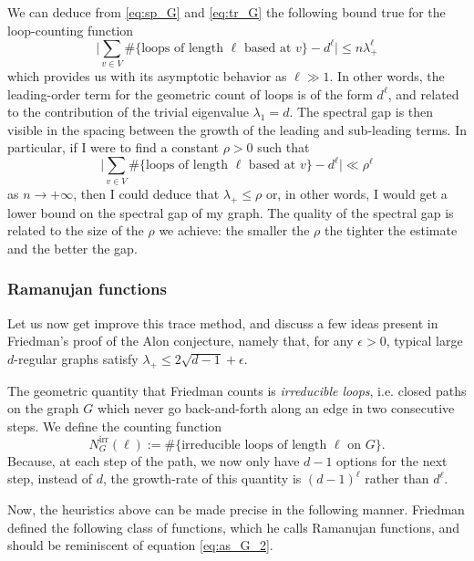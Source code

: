 \documentclass[12pt,twoside]{article}
\theoremstyle{theorem}
\theoremstyle{remark}
\theoremstyle{definition}
\theoremstyle{example}
\newcommand{\1}[1]{\mathds{1}_{#1}}
\begin{document}
We can deduce from \eqref{eq:sp_G} and \eqref{eq:tr_G} the following bound true for the
loop-counting function
\begin{equation}
  \label{eq:as_G_1}
  \Big|\sum_{v \in V} \# \{\text{loops of length } \ell \text{ based at } v\}
  - d^\ell \Big| \leq n \lambda_+^\ell
\end{equation}
which provides us with its asymptotic behavior as $\ell \gg 1$.  In other words, the leading-order
term for the geometric count of loops is of the form $d^\ell$, and related to the contribution of
the trivial eigenvalue $\lambda_1=d$. The spectral gap is then visible in the spacing between the
growth of the leading and sub-leading terms. In particular, if I were to find a constant $\rho>0$
such that
\begin{equation}
  \label{eq:as_G_2}
  \Big|\sum_{v \in V} \# \{\text{loops of length } \ell \text{ based at } v\}
  - d^\ell \Big| \ll \rho^\ell
\end{equation}
as $n \rightarrow + \infty$, then I could deduce that $\lambda_+ \leq \rho$ or, in
other words, I would get a lower bound on the spectral gap of my graph. The quality of the spectral
gap is related to the size of the $\rho$ we achieve: the smaller the $\rho$ the tighter the estimate
and the better the gap.

\subsubsection{Ramanujan functions}
\label{sec:ramanujan-functions}

Let us now get improve this trace method, and discuss a few ideas present in Friedman's proof of the
Alon conjecture, namely that, for any $\epsilon >0$, typical large $d$-regular graphs satisfy
$\lambda_+ \leq 2 \sqrt{d-1}+\epsilon$.

The geometric quantity that Friedman counts is \emph{irreducible loops}, i.e. closed paths on the
graph $G$ which never go back-and-forth along an edge in two consecutive steps. We define the
counting function
\begin{equation*}
  N_G^{\mathrm{irr}}(\ell) := \# \{ \text{irreducible loops of length } \ell \text{ on } G\}.
\end{equation*}
Because, at each step of the path, we now only have $d-1$ options for the next step, instead of $d$,
the growth-rate of this quantity is $(d-1)^\ell$ rather than $d^\ell$.

Now, the heuristics above can be made precise in the following manner. Friedman defined the
following class of functions, which he calls Ramanujan functions, and should be reminiscent of
equation \eqref{eq:as_G_2}. 
\end{document}
